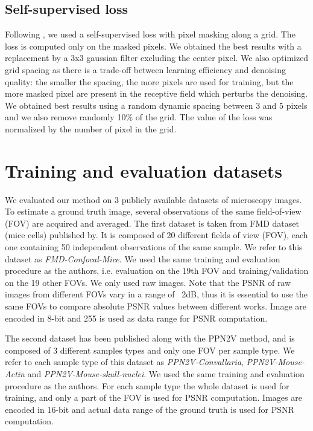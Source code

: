 \documentclass[review]{cvpr}
\begin{document}
\subsection{Self-supervised loss}
Following \cite{batson2019noise2self}, we used a self-supervised loss with pixel masking along a grid. The loss is computed only on the masked pixels. 
We obtained the best results with a replacement by a 3x3 gaussian filter excluding the center pixel.
We also optimized grid spacing as there is a trade-off between learning efficiency and denoising quality: the smaller the spacing, the more pixels are used for training, but the more masked pixel are present in the receptive field which perturbs the denoising. We obtained best results using a random dynamic spacing between 3 and 5 pixels and we also remove randomly 10\% of the grid. The value of the loss was normalized by the number of pixel in the grid.


\section{Training and evaluation datasets}
We evaluated our method on 3 publicly available datasets of microscopy images. To estimate a ground truth image, several observations of the same field-of-view (FOV) are acquired and averaged. 
The first dataset is taken from FMD dataset (mice cells) published by. It is composed of 20 different fields of view (FOV), each one containing 50 independent observations of the same sample. We refer to this dataset as \emph{FMD-Confocal-Mice}. We used the same training and evaluation procedure as the authors, i.e. evaluation on the 19th FOV and training/validation on the 19 other FOVs. We only used raw images. Note that the PSNR of raw images from different FOVs vary in a range of ~2dB, thus it is essential to use the same FOVs to compare absolute PSNR values between different works. Image are encoded in 8-bit and 255 is used as data range for PSNR computation.

The second dataset has been published along with the PPN2V method, and is composed of 3 different samples types and only one FOV per sample type. We refer to each sample type of this dataset as \emph{PPN2V-Convallaria}, \emph{PPN2V-Mouse-Actin} and \emph{PPN2V-Mouse-skull-nuclei}. We used the same training and evaluation procedure as the authors. For each sample type the whole dataset is used for training, and only a part of the FOV is used for PSNR computation. Images are encoded in 16-bit and actual data range of the ground truth is used for PSNR computation. 
\end{document}
